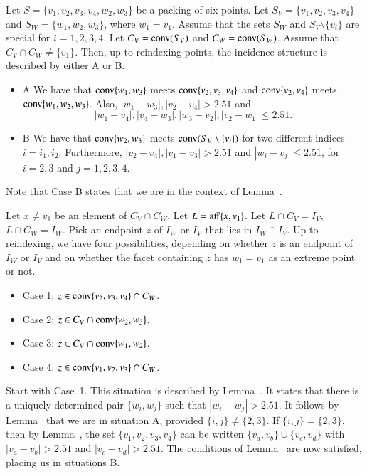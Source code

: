 \begin{tarskidata}
\begin{tarski}
\begin{lemma}
Let $S=\{v_1,v_2,v_3,v_4,w_2,w_3\}$ be a packing of six points.
Let $S_V = \{v_1,v_2,v_3,v_4\}$ and $S_W=\{w_1,w_2,w_3\}$, where $w_1=v_1$.  
Assume
that the sets $S_W$ and $S_V\setminus\{v_i\}$ are special for
$i=1,2,3,4$.
Let $C_V={\operatorname{conv}}(S_V)$ and $C_W={\operatorname{conv}}(S_W)$.
Assume that $C_V\cap C_W\ne \{v_1\}$.
Then, up to reindexing points, the incidence structure 
is described by either A or B.
\begin{itemize}
\item{A} We have that ${\operatorname{conv}}\{w_1,w_3\}$ meets ${\operatorname{conv}}\{v_2,v_3,v_4\}$
and ${\operatorname{conv}}\{v_2,v_4\}$ meets ${\operatorname{conv}}\{w_1,w_2,w_3\}$.
Also, $|w_1-w_3|,|v_2-v_4|>2.51$ and 
  $$
  |w_1-v_4|,|v_4-w_3|,|w_3-v_2|,|v_2-w_1|\le 2.51.
  $$
\item{B} We have that ${\operatorname{conv}}\{w_2,w_3\}$ meets ${\operatorname{conv}}(S_V\setminus\{v_i\})$ for two different indices $i=i_1,i_2$.  Furthermore,
$|v_2-v_4|,|v_1-v_3|>2.51$ and 
$|w_i-v_j|\le 2.51$, for $i=2,3$ and $j=1,2,3,4$.
\end{itemize}
\end{lemma}

\begin{proved}  Note that Case B states that we are in the context
of Lemma~.

Let $x\ne v_1$ be an element of $C_V\cap C_W$.  Let $L={\operatorname{aff}}\{x,v_1\}$.
Let $L\cap C_V = I_V$, $L\cap C_W = I_W$.  Pick an endpoint $z$ of $I_W$
or $I_V$ that lies in $I_W\cap I_V$.  
Up to reindexing, we have four possibilities, depending on whether
$z$ is an endpoint of $I_W$ or $I_V$ and on whether the facet containing
$z$ has $w_1=v_1$ as an extreme point or not.
\begin{itemize}
  \item Case 1: $z\in {\operatorname{conv}}\{v_2,v_3,v_4\}\cap C_W$.
  \item Case 2: $z\in C_V \cap {\operatorname{conv}}\{w_2,w_3\}$.
  \item Case 3: $z\in C_V \cap {\operatorname{conv}}\{w_1,w_2\}$.
  \item Case 4: $z\in {\operatorname{conv}}\{v_1,v_2,v_3\}\cap C_W$.
\end{itemize}
Start with Case~1.  This situation is described by 
Lemma~.  It states that there is a uniquely
determined pair $\{w_i,w_j\}$ such that $|w_i-w_j|>2.51$.
It follows by Lemma~
that we are in situation A, provided $\{i,j\}\ne\{2,3\}$.
If $\{i,j\}=\{2,3\}$,  then by Lemma~, the
set $\{v_1,v_2,v_3,v_4\}$ can be written $\{v_a,v_b\}\cup \{v_c,v_d\}$
with $|v_a-v_b|>2.51$ and $|v_c-v_d|>2.51$.  The conditions of
Lemma~ are now satisfied, placing us in
situations B.


\end{proved}
\end{tarski}
\end{tarskidata}
